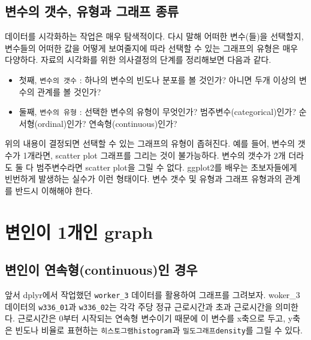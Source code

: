 \documentclass[
]{book}
\theoremstyle{definition}
\theoremstyle{definition}
\theoremstyle{definition}
\theoremstyle{definition}
\theoremstyle{remark}
\begin{document}
\hypertarget{uxbcc0uxc218uxc758-uxac2fuxc218-uxc720uxd615uxacfc-uxadf8uxb798uxd504-uxc885uxb958}{%
\subsection{변수의 갯수, 유형과 그래프 종류}\label{uxbcc0uxc218uxc758-uxac2fuxc218-uxc720uxd615uxacfc-uxadf8uxb798uxd504-uxc885uxb958}}

데이터를 시각화하는 작업은 매우 탐색적이다. 다시 말해 어떠한 변수(들)을 선택할지, 변수들의 어떠한 값을 어떻게 보여줄지에 따라 선택할 수 있는 그래프의 유형은 매우 다양하다.
자료의 시각화를 위한 의사결정의 단계를 정리해보면 다음과 같다.

\begin{itemize}
\item
  첫째, \texttt{변수의\ 갯수} : 하나의 변수의 빈도나 분포를 볼 것인가? 아니면 두개 이상의 변수의 관계를 볼 것인가?
\item
  둘째, \texttt{변수의\ 유형} : 선택한 변수의 유형이 무엇인가? 범주변수(categorical)인가? 순서형(ordinal)인가? 연속형(continuous)인가?
\end{itemize}

위의 내용이 결정되면 선택할 수 있는 그래프의 유형이 좁혀진다. 예를 들어, 변수의 갯수가 1개라면, scatter plot 그래프를 그리는 것이 불가능하다. 변수의 갯수가 2개 더라도 둘 다 범주변수라면 scatter plot을 그릴 수 없다. ggplot2를 배우는 초보자들에게 빈번하게 발생하는 실수가 이런 형태이다. 변수 갯수 및 유형과 그래프 유형과의 관계를 반드시 이해해야 한다.

\hypertarget{uxbcc0uxc778uxc774-1uxac1cuxc778-graph}{%
\section{변인이 1개인 graph}\label{uxbcc0uxc778uxc774-1uxac1cuxc778-graph}}

\hypertarget{uxbcc0uxc778uxc774-uxc5f0uxc18duxd615continuousuxc778-uxacbduxc6b0}{%
\subsection{변인이 연속형(continuous)인 경우}\label{uxbcc0uxc778uxc774-uxc5f0uxc18duxd615continuousuxc778-uxacbduxc6b0}}

앞서 dplyr에서 작업했던 \texttt{worker\_3} 데이터를 활용하여 그래프를 그려보자. woker\_3 데이터의 \texttt{w336\_01}과 \texttt{w336\_02}는 각각 주당 정규 근로시간과 초과 근로시간을 의미한다. 근로시간은 0부터 시작되는 연속형 변수이기 때문에 이 변수를 x축으로 두고, y축은 빈도나 비율로 표현하는 \texttt{히스토그램histogram}과 \texttt{밀도그래프density}를 그릴 수 있다.
\end{document}
